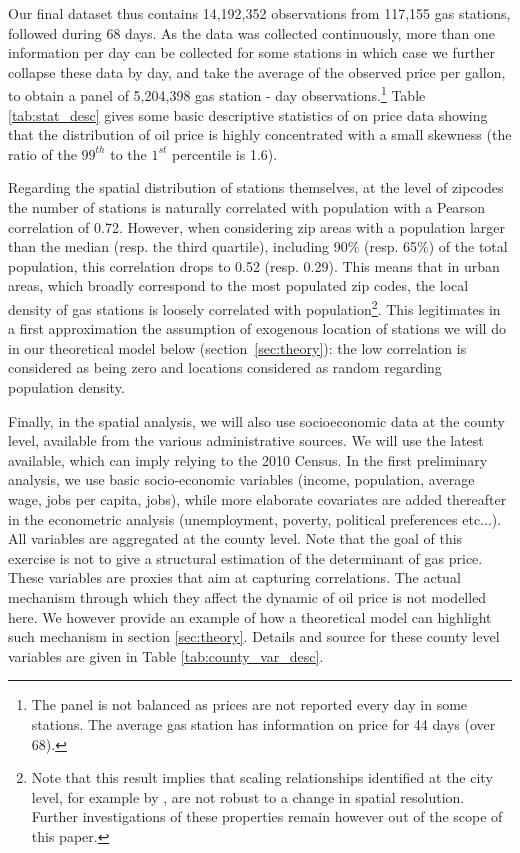\documentclass[10pt]{article}
\begin{document}
Our final dataset thus contains 14,192,352 observations from 117,155 gas stations, followed during 68 days. As the data was collected continuously, more than one information per day can be collected for some stations in which case we further collapse these data by day, and take the average of the observed price per gallon, to obtain a panel of 5,204,398 gas station - day observations.\footnote{The panel is not balanced as prices are not reported every day in some stations. The average gas station has information on price for 44 days (over 68).}  Table \ref{tab:stat_desc} gives some basic descriptive statistics of on price data showing that the distribution of oil price is highly concentrated with a small skewness (the ratio of the $99^{th}$ to the $1^{st}$ percentile is 1.6).


Regarding the spatial distribution of stations themselves, at the level of zipcodes the number of stations is naturally correlated with population with a Pearson correlation of 0.72. However, when considering zip areas with a population larger than the median (resp. the third quartile), including 90\% (resp. 65\%) of the total population, this correlation drops to 0.52 (resp. 0.29). This means that in urban areas, which broadly correspond to the most populated zip codes, the local density of gas stations is loosely correlated with population\footnote{Note that this result implies that scaling relationships identified at the city level, for example by \cite{bettencourt2007growth}, are not robust to a change in spatial resolution. Further investigations of these properties remain however out of the scope of this paper.}. This legitimates in a first approximation the assumption of exogenous location of stations we will do in our theoretical model below (section~\ref{sec:theory}): the low correlation is considered as being zero and locations considered as random regarding population density.

Finally, in the spatial analysis, we will also use socioeconomic data at the county level, available from the various administrative sources. We will use the latest available, which can imply relying to the 2010 Census. In the first preliminary analysis, we use basic socio-economic variables (income, population, average wage, jobs per capita, jobs), while more elaborate covariates are added thereafter in the econometric analysis (unemployment, poverty, political preferences etc...). All variables are aggregated at the county level. Note that the goal of this exercise is not to give a structural estimation of the determinant of gas price. These variables are proxies that aim at capturing correlations. The actual mechanism through which they affect the dynamic of oil price is not modelled here. We however provide an example of how a theoretical model can highlight such mechanism in section \ref{sec:theory}. Details and source for these county level variables are given in Table \ref{tab:county_var_desc}.
\end{document}
